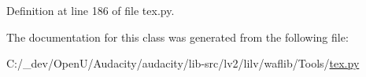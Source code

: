 Definition at line 186 of file tex.\+py.



The documentation for this class was generated from the following file\+:\begin{DoxyCompactItemize}
\item 
C\+:/\+\_\+dev/\+Open\+U/\+Audacity/audacity/lib-\/src/lv2/lilv/waflib/\+Tools/\hyperlink{lilv_2waflib_2_tools_2tex_8py}{tex.\+py}\end{DoxyCompactItemize}
